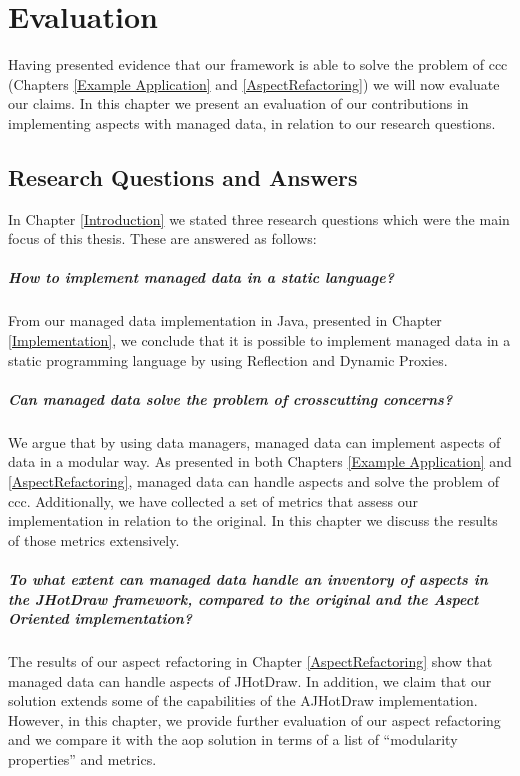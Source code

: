 
\chapter{Evaluation}\label{Evaluation}

Having presented evidence that our framework is able to solve the problem of \ac{ccc} (Chapters \ref{Example Application} and \ref{AspectRefactoring}) we will now evaluate our claims.
In this chapter we present an evaluation of our contributions in implementing aspects with managed data, in relation to our research questions.

\section{Research Questions and Answers}\label{Research Questions and Answers}
In Chapter \ref{Introduction} we stated three research questions which were the main focus of this thesis.
These are answered as follows:

\paragraph{How to implement managed data in a static language?}
From our managed data implementation in Java, presented in Chapter \ref{Implementation}, we conclude that it is possible to implement managed data in a static programming language by using Reflection and Dynamic Proxies.

\paragraph{Can managed data solve the problem of crosscutting concerns?}
We argue that by using data managers, managed data can implement aspects of data in a modular way.
As presented in both Chapters \ref{Example Application} and \ref{AspectRefactoring}, managed data can handle aspects and solve the problem of \acrlong{ccc}.
Additionally, we have collected a set of metrics that assess our implementation in relation to the original.
In this chapter we discuss the results of those metrics extensively.

\paragraph{To what extent can managed data handle an inventory of aspects in the JHotDraw framework, compared to the original and the Aspect Oriented implementation?}
The results of our aspect refactoring in Chapter \ref{AspectRefactoring} show that managed data can handle aspects of JHotDraw. 
In addition, we claim that our solution extends some of the capabilities of the AJHotDraw implementation.
However, in this chapter, we provide further evaluation of our aspect refactoring and we compare it with the \acrlong{aop} solution in terms of a list of ``modularity properties'' and metrics.

